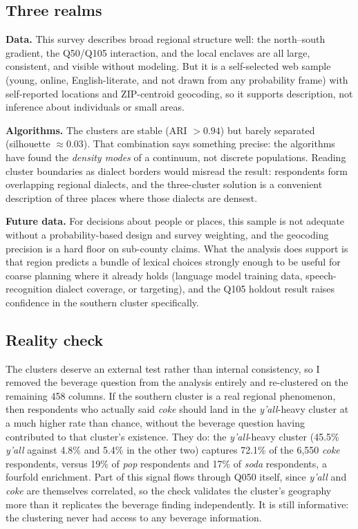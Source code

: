 \documentclass[10pt,letterpaper]{article}
\begin{document}
\subsection{Three realms}

\textbf{Data.} This survey describes broad regional structure well: the
north--south gradient, the Q50/Q105 interaction, and the local enclaves are all
large, consistent, and visible without modeling. But it is a self-selected web
sample (young, online, English-literate, and not drawn from any probability
frame) with self-reported locations and ZIP-centroid geocoding, so it
supports description, not inference about individuals or small areas.

\textbf{Algorithms.} The clusters are stable (ARI $> 0.94$) but barely
separated (silhouette $\approx 0.03$). That combination says something precise:
the algorithms have found the \emph{density modes} of a continuum, not discrete
populations. Reading cluster boundaries as dialect borders would misread the result:
respondents form overlapping regional dialects, and the three-cluster solution
is a convenient description of three places where those dialects are densest.

\textbf{Future data.} For decisions about people or places, this sample is not
adequate without a probability-based design and survey weighting, and the
geocoding precision is a hard floor on sub-county claims. What the analysis
does support is that region predicts a bundle of lexical choices strongly
enough to be useful for coarse planning where it already holds (language
model training data, speech-recognition dialect coverage, or targeting), and
the Q105 holdout result raises confidence in the southern cluster specifically.

\subsection{Reality check}

The clusters deserve an external test rather than internal consistency, so I
removed the beverage question from the analysis entirely and re-clustered on
the remaining 458 columns. If the southern cluster is a real regional
phenomenon, then respondents who actually said \emph{coke} should land in the
\emph{y'all}-heavy cluster at a much higher rate than chance, without the
beverage question having contributed to that cluster's existence. They do:
the \emph{y'all}-heavy cluster (45.5\% \emph{y'all} against 4.8\% and 5.4\% in
the other two) captures 72.1\% of the 6,550 \emph{coke} respondents, versus
19\% of \emph{pop} respondents and 17\% of \emph{soda} respondents, a
fourfold enrichment. Part of this signal flows through Q050 itself, since
\emph{y'all} and \emph{coke} are themselves correlated, so the check validates
the cluster's geography more than it replicates the beverage finding
independently. It is still informative: the clustering never had access to
any beverage information.
\end{document}
